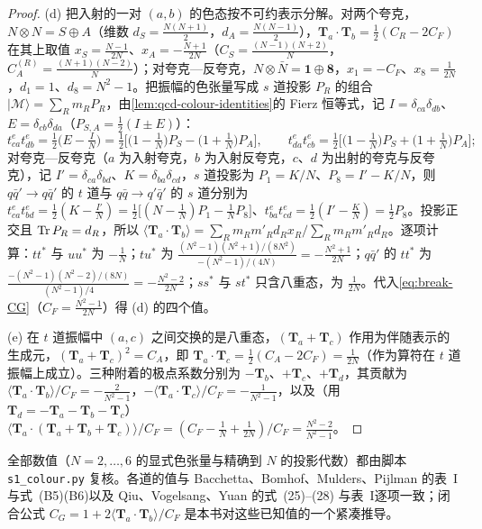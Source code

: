 \begin{proof}
(d) 把入射的一对 $(a,b)$ 的色态按不可约表示分解。对两个夸克，$N\otimes N=S\oplus A$（维数 $d_S=\frac{N(N+1)}2$，$d_A=\frac{N(N-1)}2$），$\mathbf T_a\cdot\mathbf T_b=\frac12(C_R-2C_F)$ 在其上取值 $x_S=\frac{N-1}{2N}$、$x_A=-\frac{N+1}{2N}$（$C_S=\frac{(N-1)(N+2)}N$，$C_A^{(R)}=\frac{(N+1)(N-2)}N$）；对夸克—反夸克，$N\otimes\bar N=\mathbf 1\oplus\mathbf 8$，$x_1=-C_F$、$x_8=\frac1{2N}$，$d_1=1$、$d_8=N^2-1$。把振幅的色张量写成 $s$ 道投影 $P_R$ 的组合 $|\mathcal M\rangle=\sum_Rm_RP_R$，由\cref{lem:qcd-colour-identities}的 Fierz 恒等式，记 $I=\delta_{ca}\delta_{db}$、$E=\delta_{cb}\delta_{da}$（$P_{S,A}=\frac12(I\pm E)$）：
\[
t^e_{ca}t^e_{db}=\tfrac12\big(E-\tfrac IN\big)=\tfrac12\Big[\big(1-\tfrac1N\big)P_S-\big(1+\tfrac1N\big)P_A\Big],\qquad
t^e_{da}t^e_{cb}=\tfrac12\Big[\big(1-\tfrac1N\big)P_S+\big(1+\tfrac1N\big)P_A\Big];
\]
对夸克—反夸克（$a$ 为入射夸克，$b$ 为入射反夸克，$c$、$d$ 为出射的夸克与反夸克），记 $I'=\delta_{ca}\delta_{bd}$、$K=\delta_{ba}\delta_{cd}$，$s$ 道投影为 $P_1=K/N$、$P_8=I'-K/N$，则 $q\bar q'\to q\bar q'$ 的 $t$ 道与 $q\bar q\to q'\bar q'$ 的 $s$ 道分别为 $t^e_{ca}t^e_{bd}=\frac12(K-\frac{I'}N)=\frac12\big[(N-\frac1N)P_1-\frac1NP_8\big]$、$t^e_{ba}t^e_{cd}=\frac12(I'-\frac KN)=\frac12P_8$。投影正交且 $\operatorname{Tr} P_R=d_R$，所以
$\langle\mathbf T_a\cdot\mathbf T_b\rangle=\sum_Rm_Rm'_Rd_Rx_R\big/\sum_Rm_Rm'_Rd_R$。逐项计算：$tt^*$ 与 $uu^*$ 为 $-\frac1N$；$tu^*$ 为 $\frac{(N^2-1)(N^2+1)/(8N^2)}{-(N^2-1)/(4N)}=-\frac{N^2+1}{2N}$；$q\bar q'$ 的 $tt^*$ 为 $\frac{-(N^2-1)(N^2-2)/(8N)}{(N^2-1)/4}=-\frac{N^2-2}{2N}$；$ss^*$ 与 $st^*$ 只含八重态，为 $\frac1{2N}$。代入\cref{eq:break-CG}（$C_F=\frac{N^2-1}{2N}$）得 (d) 的四个值。

(e) 在 $t$ 道振幅中 $(a,c)$ 之间交换的是八重态，$(\mathbf T_a+\mathbf T_c)$ 作用为伴随表示的生成元，$(\mathbf T_a+\mathbf T_c)^2=C_A$，即 $\mathbf T_a\cdot\mathbf T_c=\frac12(C_A-2C_F)=\frac1{2N}$（作为算符在 $t$ 道振幅上成立）。三种附着的极点系数分别为 $-\mathbf T_b$、$+\mathbf T_c$、$+\mathbf T_d$，其贡献为 $\langle\mathbf T_a\cdot\mathbf T_b\rangle/C_F=-\frac{2}{N^2-1}$，$-\langle\mathbf T_a\cdot\mathbf T_c\rangle/C_F=-\frac1{N^2-1}$，以及（用 $\mathbf T_d=-\mathbf T_a-\mathbf T_b-\mathbf T_c$）$\langle\mathbf T_a\cdot(\mathbf T_a+\mathbf T_b+\mathbf T_c)\rangle/C_F=(C_F-\frac1N+\frac1{2N})/C_F=\frac{N^2-2}{N^2-1}$。
\end{proof}

全部数值（$N=2,\dots,6$ 的显式色张量与精确到 $N$ 的投影代数）都由脚本 \texttt{s1\_colour.py} 复核。各道的值与 Bacchetta、Bomhof、Mulders、Pijlman 的表~I 与式~(B5)(B6)\cite{BacchettaBomhofMuldersPijlman2005}以及 Qiu、Vogelsang、Yuan 的式~(25)--(28) 与表~I\cite{QiuVogelsangYuan2007}逐项一致；闭合公式 $C_G=1+2\langle\mathbf T_a\cdot\mathbf T_b\rangle/C_F$ 是本书对这些已知值的一个紧凑推导。

